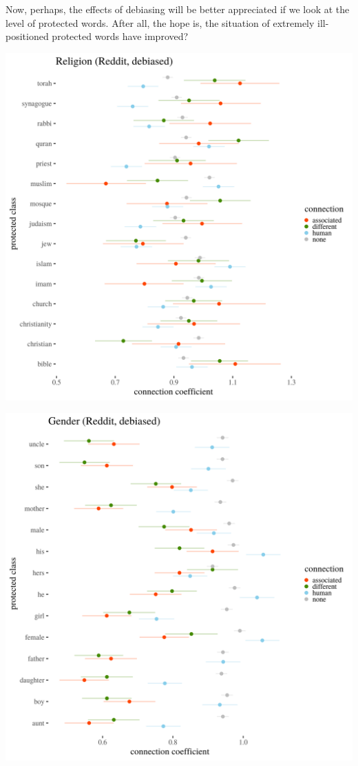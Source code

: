 \documentclass[12pt,]{book}
\begin{document}
Now, perhaps, the effects of debiasing will be better appreciated if we
look at the level of protected words. After all, the hope is, the
situation of extremely ill-positioned protected words have improved?

\includegraphics[width=14cm]{../images/visDebReligionReddit.png}

\includegraphics[width=14cm]{../images/visDebGenderReddit.png}
\end{document}
